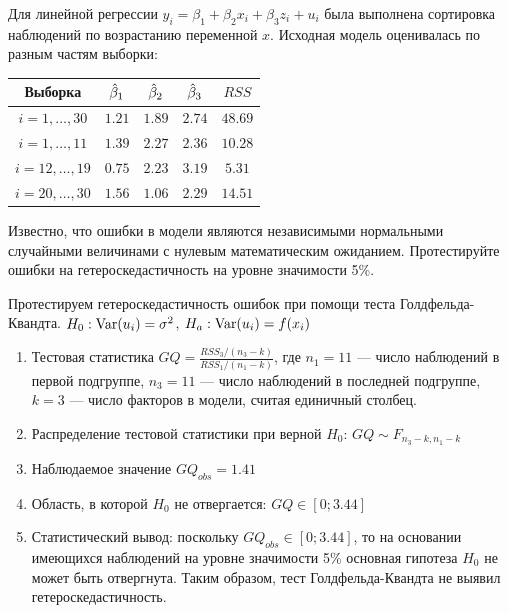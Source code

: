\begin{problem}
Для линейной регрессии $y_i = \beta_1 + \beta_2 x_i + \beta_3 z_i + u_i$ была
выполнена сортировка наблюдений по возрастанию переменной $x$. Исходная модель оценивалась по разным частям выборки:

\begin{tabular}{c|cccc}
\toprule
Выборка & $\hat{\beta}_1$ & $\hat{\beta}_2$ & $\hat{\beta}_3$ & $RSS$ \\
\midrule
$i=1,\ldots, 30$ & $1.21$ & $1.89$ & $2.74$ & $48.69$ \\
$i=1,\ldots, 11$ & $1.39$ & $2.27$ & $2.36$ & $10.28$ \\
$i=12,\ldots, 19$ & $0.75$ & $2.23$ & $3.19$ & $5.31$ \\
$i=20,\ldots, 30$ & $1.56$ & $1.06$ & $2.29$ & $14.51$ \\
\bottomrule
\end{tabular}

Известно, что ошибки в модели являются независимыми нормальными случайными величинами с нулевым математическим ожиданием. Протестируйте
ошибки на гетероскедастичность на уровне значимости 5\%.



\begin{sol}
Протестируем гетероскедастичность ошибок при помощи теста Голдфельда-
Квандта. $H_0: \operatorname{Var}(u_i)=\sigma^2$, $H_a: \operatorname{Var}(u_i)=f(x_i)$

\begin{enumerate}
\item Тестовая статистика $GQ=\frac{RSS_3/(n_3-k)}{RSS_1/(n_1-k)}$, где $n_1=11$ — число наблюдений в первой подгруппе, $n_3=11$ — число наблюдений в
последней подгруппе, $k=3$ — число факторов в модели, считая единичный столбец.
\item Распределение тестовой статистики при верной $H_0$: $GQ\sim F_{n_3-k,n_1-k}$
\item Наблюдаемое значение $GQ_{obs}=1.41$
\item Область, в которой $H_0$ не отвергается: $GQ\in [0;3.44]$
\item Статистический вывод: поскольку $GQ_{obs} \in [0;3.44]$, то на основании имеющихся наблюдений на уровне значимости 5\% основная гипотеза $H_0$ не может быть отвергнута. Таким образом, тест Голдфельда-Квандта не выявил гетероскедастичность.
\end{enumerate}
\end{sol}
\end{problem}



